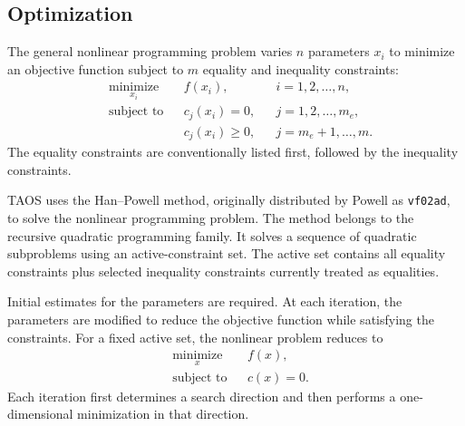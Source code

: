 \subsection{Optimization}\label{sec:optimization}

The general nonlinear programming problem varies $n$ parameters $x_i$ to minimize
an objective function subject to $m$ equality and inequality constraints:
\begin{equation}
\begin{aligned}
  &\underset{x_i}{\operatorname{minimize}}
  && f(x_i), && i=1,2,\ldots,n,\\
  &\text{subject to}
  && c_j(x_i)=0, && j=1,2,\ldots,m_e,\\
  &&& c_j(x_i)\ge 0, && j=m_e+1,\ldots,m.
\end{aligned}
\label{eq:general-nonlinear-program}
\end{equation}
The equality constraints are conventionally listed first, followed by the inequality
constraints.


TAOS uses the Han--Powell method, originally distributed by Powell as
\texttt{vf02ad}, to solve the nonlinear programming problem. The
method belongs to the recursive quadratic programming family. It solves a sequence
of quadratic subproblems using an active-constraint set. The active set contains all
equality constraints plus selected inequality constraints currently treated as
equalities.

Initial estimates for the parameters are required. At each iteration, the parameters
are modified to reduce the objective function while satisfying the constraints. For a
fixed active set, the nonlinear problem reduces to
\begin{equation}
\begin{aligned}
  &\underset{x}{\operatorname{minimize}} && f(x),\\
  &\text{subject to} && c(x)=0.
\end{aligned}
\label{eq:active-set-equality-problem}
\end{equation}
Each iteration first determines a search direction and then performs a
one-dimensional minimization in that direction.

